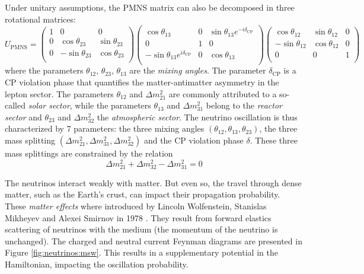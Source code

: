 \documentclass[../main.tex]{subfiles}
\begin{document}
Under unitary assumptions, the PMNS matrix can also be decomposed in three rotational matrices:
\begin{equation}
  U_{\text{PMNS}} = \begin{pmatrix}
    1 & 0 & 0 \\
    0 & \cos \theta_{23} & \sin \theta_{23} \\
    0 & -\sin \theta_{23} & \cos \theta_{23} \\
  \end{pmatrix} \begin{pmatrix}
    \cos \theta_{13} & 0 & \sin \theta_{13} e^{-i\delta_{\text{CP}}}\\
    0 & 1 & 0 \\
    -\sin \theta_{13} e^{i\delta_{\text{CP}}} & 0 &  \cos \theta_{13} \\
  \end{pmatrix} \begin{pmatrix}
    \cos \theta_{12} & \sin \theta_{12} & 0 \\
    -\sin \theta_{12} & \cos \theta_{12} & 0 \\
    0 & 0 & 1 \\
  \end{pmatrix}
\end{equation}
where the parameters $\theta_{12}$, $\theta_{23}$, $\theta_{13}$ are the \textit{mixing angles}. The parameter $\delta_{\text{CP}}$ is a CP violation phase that quantifies the matter-antimatter asymmetry in the lepton sector. The parameters $\theta_{12}$ and $\Delta m^2_{21}$ are commonly attributed to a so-called \textit{solar sector}, while the parameters $\theta_{13}$ and $\Delta m^2_{31}$ belong to the \textit{reactor sector} and $\theta_{23}$ and $\Delta m^2_{32}$ the \textit{atmospheric sector}. The neutrino oscillation is thus characterized by 7 parameters: the three mixing angles $(\theta_{12}, \theta_{13}, \theta_{23})$, the three mass splitting $(\Delta m^2_{21}, \Delta m^2_{31}, \Delta m^2_{32})$ and the CP violation phase $\delta$.
These three mass splittings are constrained by the relation
\begin{equation}
  \Delta m^2_{21} + \Delta m^2_{32} - \Delta m^2_{31} = 0
\end{equation}

The neutrinos interact weakly with matter. But even so, the travel through dense matter, such as the Earth's crust, can impact their propagation probability. These \textit{matter effects} where introduced by Lincoln Wolfenstein, Stanislas Mikheyev and Alexei Smirnov in 1978 \cite{wolfenstein_neutrino_1978}. They result from forward elastics scattering of neutrinos with the medium (the momentum of the neutrino is unchanged). The charged and neutral current Feynman diagrams are presented in Figure \ref{fig:neutrinos:msw}. This results in a supplementary potential in the Hamiltonian, impacting the oscillation probability.
\end{document}
